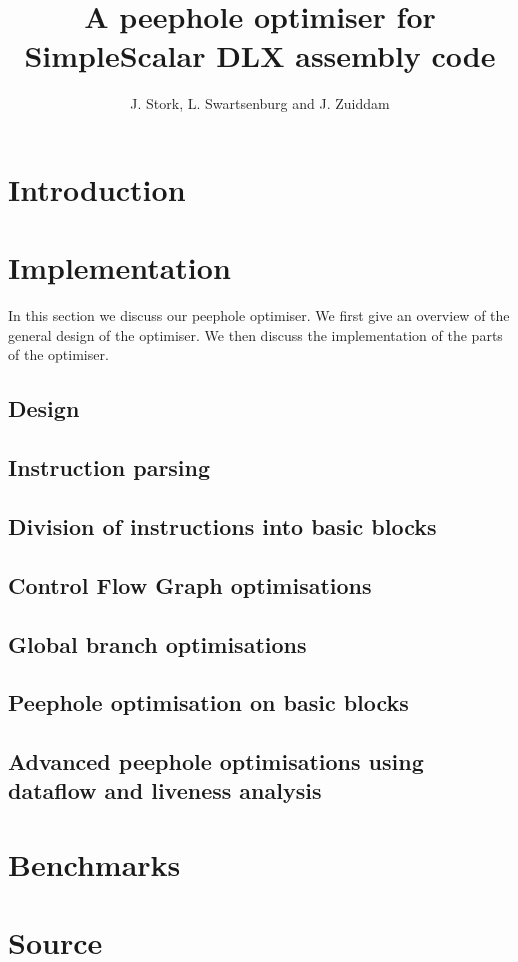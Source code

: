 \documentclass{scrreprt}
\title{A peephole optimiser for SimpleScalar DLX assembly code}
\author{J. Stork, L. Swartsenburg and J. Zuiddam}
\begin{document}
\maketitle

\tableofcontents

\chapter{Introduction}
\label{sec:introduction}



\chapter{Implementation}

In this section we discuss our peephole optimiser. We first give an overview of
the general design of the optimiser. We then discuss the implementation of the
parts of the optimiser.

\section{Design}
\label{sec:design}


\section{Instruction parsing}
\label{sec:parsing}


\section{Division of instructions into basic blocks}
\label{sec:splitting}


\section{Control Flow Graph optimisations}
\label{sec:graph}


\section{Global branch optimisations}
\label{sec:global}


\section{Peephole optimisation on basic blocks}
\label{sec:peephole}


\section{Advanced peephole optimisations using dataflow and liveness analysis}
\label{sec:advanced}



\chapter{Benchmarks}
\label{sec:benchmarks}



\appendix
\chapter{Source}
\label{ch:source}

\end{document}
